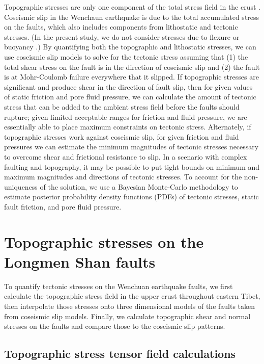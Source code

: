 \documentclass[twocolumn,jgrga]{AGUTeX}
\begin{document}
\begin{article}
Topographic stresses are only one component of the total stress field in the
crust \citep{molnar1988}. Coseismic slip in the Wenchaun earthquake is due to
the total accumulated stress on the faults, which also includes components from
lithostatic and tectonic stresses. (In the present study, we do not consider
stresses due to flexure \citep[e.g.,][] {luttrell2007} or buoyancy
\citep[e.g.,][]{luttrell2011}.) By quantifying both the topographic and
lithostatic stresses, we can use coseismic slip models to solve for the
tectonic stress assuming that (1) the total shear stress on the fault is in the
direction of coseismic slip \citep[e.g.,] []{angelier1994} and (2) the fault is
at Mohr-Coulomb failure everywhere that it slipped. If topographic stresses are
significant and produce shear in the direction of fault slip, then for given
values of static friction and pore fluid pressure, we can calculate the amount
of tectonic stress that can be added to the ambient stress field before the
faults should rupture; given limited acceptable ranges for friction and fluid
pressure, we are essentially able to place maximum constraints on tectonic
stress. Alternately, if topographic stresses work against coseismic slip, for
given friction and fluid pressures we can estimate the minimum magnitudes of
tectonic stresses necessary to overcome shear and frictional resistance to
slip. In a scenario with complex faulting and topography, it may be possible to
put tight bounds on minimum and maximum magnitudes and directions of tectonic
stresses. To account for the non-uniqueness of the solution, we use a Bayesian
Monte-Carlo methodology to estimate posterior probability density functions
(PDFs) of tectonic stresses, static fault friction, and pore fluid pressure.

\section{Topographic stresses on the Longmen Shan
faults}\label{topographic-stresses-on-the-longmen-shan-faults}

To quantify tectonic stresses on the Wenchuan earthquake faults, we
first calculate the topographic stress field in the upper crust
throughout eastern Tibet, then interpolate those stresses onto three
dimensional models of the faults taken from coseismic slip models.
Finally, we calculate topographic shear and normal stresses on the
faults and compare those to the coseismic slip patterns.

\subsection{Topographic stress tensor field
calculations}\label{topographic-stress-tensor-field-calculations}


\end{article}
\end{document}
